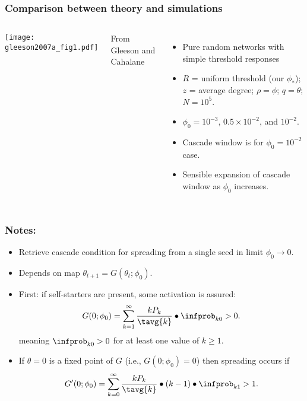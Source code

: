 \begin{frame}
  \frametitle{Comparison between theory and simulations}

  \begin{columns}
    \texttt{[image: gleeson2007a\_fig1.pdf]}
    
    {\small From Gleeson and Cahalane\cite{gleeson2007a}}
    \begin{itemize}
    \item 
      Pure random networks with simple threshold responses
    \item 
      $R$ = uniform threshold (our $\phi_\ast$);
      $z$ = average degree; $\rho = \phi$; $q = \theta$; $N=10^5$.
    \item 
      $\phi_0 = 10^{-3}$, $0.5 \times 10^{-2}$,
      and 
      $10^{-2}$.
    \item
      Cascade window is for $\phi_0 = 10^{-2}$ case.
    \item
      Sensible expansion of cascade window as $\phi_0$ increases.
    \end{itemize}
  \end{columns}
\end{frame}

\begin{frame}
  \frametitle{Notes:}

    \begin{itemize}
    \item<1->
      Retrieve cascade condition for 
      spreading from a single seed in limit $\phi_0 \rightarrow 0$.
    \item<2-> 
      Depends on map $\theta_{t+1} = G(\theta_{t};\phi_0)$.
    \item<3-> 
      First: if self-starters are present, some activation is assured:
      $$
      G(0;\phi_0) = 
      \sum_{k=1}^{\infty} 
      \frac{kP_k}{\tavg{k}}
      \bullet
      \infprob_{k0} > 0.
      $$
      meaning $\infprob_{k0}>0$ for at least one value of $k \ge 1$.
    \item<4-> 
      If $\theta=0$ is a fixed point of $G$ (i.e., $G(0;\phi_0) = 0$)
      then spreading occurs if
      $$
      G'(0;\phi_0) = 
      \sum_{k=0}^{\infty} 
      \frac{k P_k}{\tavg{k}}
      \bullet
      (k-1) 
      \bullet
      \infprob_{k1} > 1.
      $$
    \end{itemize}
\end{frame}

